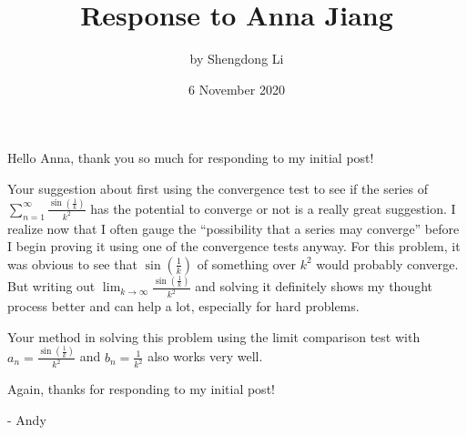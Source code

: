 \documentclass[12pt]{article}
\begin{document}
\title{Response to Anna Jiang}
\author{by Shengdong Li}
\date{6 November 2020}
\maketitle
Hello Anna, thank you so much for responding to my initial post!

Your suggestion about first using the convergence test to see if the series of $\sum_{n=1}^{\infty}\frac{\sin\left(\frac{1}{k}\right)}{k^{2}}$ has the potential to converge or not is a really great suggestion.  I realize now that I often gauge the ``possibility that a series may converge'' before I begin proving it using one of the convergence tests anyway. For this problem, it was obvious to see that $\sin\left(\frac{1}{k}\right)$ of something over $k^{2}$ would probably converge. But writing out $\lim_{k\to\infty}\frac{\sin\left(\frac{1}{k}\right)}{k^{2}}$ and solving it definitely shows my thought process better and can help a lot, especially for hard problems. 

Your method in solving this problem using the limit comparison test with $a_{n}=\frac{\sin\left(\frac{1}{k}\right)}{k^{2}}$ and $b_{n}=\frac{1}{k^{2}}$ also works very well.

Again, thanks for responding to my initial post!

- Andy
\end{document}
